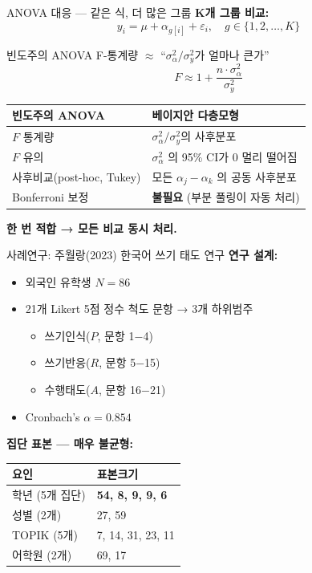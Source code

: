 \documentclass[aspectratio=169, 11pt]{beamer}
\begin{document}
\begin{frame}{ANOVA 대응 — 같은 식, 더 많은 그룹}
\textbf{K개 그룹 비교:}
$$
y_i = \mu + \alpha_{g[i]} + \varepsilon_i, \quad g \in \{1, 2, \ldots, K\}
$$

\vspace{0.2cm}
빈도주의 ANOVA F-통계량 ${\approx}$ ``$\sigma_\alpha^2 / \sigma_y^2$가 얼마나 큰가''
$$
F \approx 1 + \frac{n \cdot \sigma_\alpha^2}{\sigma_y^2}
$$

\vspace{0.2cm}
\begin{tabular}{ll}
\toprule
빈도주의 ANOVA & 베이지안 다층모형 \\
\midrule
$F$ 통계량 & $\sigma_\alpha^2 / \sigma_y^2$의 사후분포 \\
$F$ 유의 & $\sigma_\alpha^2$ 의 95\% CI가 0 멀리 떨어짐 \\
사후비교(post-hoc, Tukey) & 모든 $\alpha_j - \alpha_k$ 의 공동 사후분포 \\
Bonferroni 보정 & \textbf{불필요} (부분 풀링이 자동 처리) \\
\bottomrule
\end{tabular}

\vspace{0.3cm}
\centering
\textbf{한 번 적합 → 모든 비교 동시 처리.}
\end{frame}

\begin{frame}{사례연구: 주월랑(2023) 한국어 쓰기 태도 연구}
\textbf{연구 설계:}
\begin{itemize}
\item 외국인 유학생 $N = 86$
\item 21개 Likert 5점 정수 척도 문항 → 3개 하위범주
\begin{itemize}
\item 쓰기인식($P$, 문항 1$-$4)
\item 쓰기반응($R$, 문항 5$-$15)
\item 수행태도($A$, 문항 16$-$21)
\end{itemize}
\item Cronbach's $\alpha = 0.854$
\end{itemize}

\textbf{집단 표본 — 매우 불균형:}
\begin{tabular}{ll}
\toprule
요인 & 표본크기 \\
\midrule
학년 (5개 집단) & \textbf{54, 8, 9, 9, 6} \\
성별 (2개) & 27, 59 \\
TOPIK (5개) & 7, 14, 31, 23, 11 \\
어학원 (2개) & 69, 17 \\
\bottomrule
\end{tabular}
\end{frame}
\end{document}
